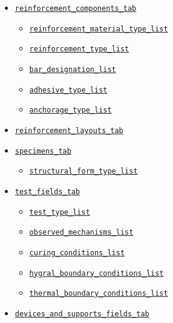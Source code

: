 \documentclass[11pt]{book}
\begin{document}
{\begin{itemize}
\begin{itemize}
        \item \hyperref[vocab:specimen_geometry_type_list]{\texttt{specimen\_geometry\_type\_list}}
   \end{itemize}
% 
   \item \hyperref[vocab:reinforcement_fields_tab]{\texttt{reinforcement\_components\_tab}}
   \begin{itemize}
        \item \hyperref[vocab:reinforcement_material_types_list]{\texttt{reinforcement\_material\_type\_list}}   
        \item \hyperref[vocab:reinforcement_type_list]{\texttt{reinforcement\_type\_list}}
        \item \hyperref[vocab:bar_designation_list]{\texttt{bar\_designation\_list}}
        \item \hyperref[vocab:adhesive_type_list]{\texttt{adhesive\_type\_list}}
        \item \hyperref[vocab:anchorage_type_list]{\texttt{anchorage\_type\_list}}
   \end{itemize}
% 
   \item \hyperref[vocab:reinforcement_layouts_fields_tab]{\texttt{reinforcement\_layouts\_tab}}
%
   \item \hyperref[vocab:specimen_fields_tab]{\texttt{specimens\_tab}}
   \begin{itemize}
        \item \hyperref[vocab:structural_form_type_list]{\texttt{structural\_form\_type\_list}}
   \end{itemize}
%   
   \item \hyperref[vocab:test_fields_tab]{\texttt{test\_fields\_tab}}
   \begin{itemize}
      \item \hyperref[vocab:test_type_list]{\texttt{test\_type\_list}}
      \item \hyperref[vocab:observed_mechanisms_list]{\texttt{observed\_mechanisms\_list}}
      \item \hyperref[vocab:curing_conditions_list]{\texttt{curing\_conditions\_list}}
      \item \hyperref[vocab:boundary_conditions_list]{\texttt{hygral\_boundary\_conditions\_list}}      
      \item \hyperref[vocab:boundary_conditions_list]{\texttt{thermal\_boundary\_conditions\_list}}
    \end{itemize}
%
   \item \hyperref[vocab:devices_and_supports_fields_tab]{\texttt{devices\_and\_supports\_fields\_tab}}

\end{itemize}}
\end{document}
